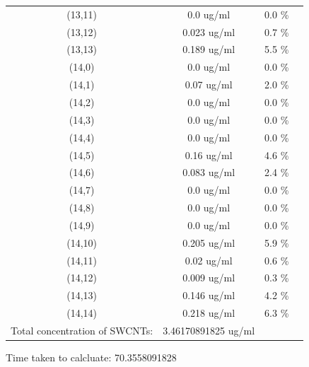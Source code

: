 \documentclass{article}
\begin{document}
\begin{tabular}{c c c c}
(13,11)&        0.0 ug/ml        &0.0 \%\\
(13,12)&        0.023 ug/ml        &0.7 \%\\
(13,13)&        0.189 ug/ml        &5.5 \%\\
(14,0)&        0.0 ug/ml        &0.0 \%\\
(14,1)&        0.07 ug/ml        &2.0 \%\\
(14,2)&        0.0 ug/ml        &0.0 \%\\
(14,3)&        0.0 ug/ml        &0.0 \%\\
(14,4)&        0.0 ug/ml        &0.0 \%\\
(14,5)&        0.16 ug/ml        &4.6 \%\\
(14,6)&        0.083 ug/ml        &2.4 \%\\
(14,7)&        0.0 ug/ml        &0.0 \%\\
(14,8)&        0.0 ug/ml        &0.0 \%\\
(14,9)&        0.0 ug/ml        &0.0 \%\\
(14,10)&        0.205 ug/ml        &5.9 \%\\
(14,11)&        0.02 ug/ml        &0.6 \%\\
(14,12)&        0.009 ug/ml        &0.3 \%\\
(14,13)&        0.146 ug/ml        &4.2 \%\\
(14,14)&        0.218 ug/ml        &6.3 \%\\
Total concentration of SWCNTs: &3.46170891825 ug/ml\\

\end{tabular}Time taken to calcluate: 70.3558091828
\end{document}

